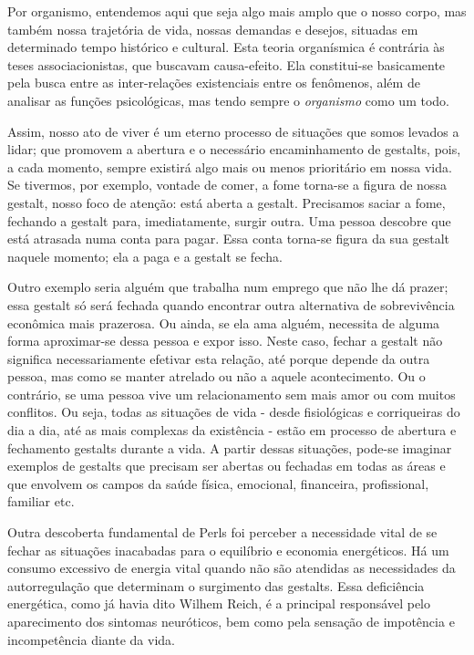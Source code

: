 Por organismo, entendemos aqui que seja algo mais amplo que o nosso
corpo, mas também nossa trajetória de vida, nossas demandas e desejos,
situadas em determinado tempo histórico e cultural. Esta teoria
organísmica é contrária às teses associacionistas, que buscavam
causa-efeito. Ela constitui-se basicamente pela busca entre as
inter-relações existenciais entre os fenômenos, além de analisar as
funções psicológicas, mas tendo sempre o \emph{organismo} como um todo.

Assim, nosso ato de viver é um eterno processo de situações que somos
levados a lidar; que promovem a abertura e o necessário encaminhamento
de gestalts, pois, a cada momento, sempre existirá algo mais ou menos
prioritário em nossa vida. Se tivermos, por exemplo, vontade de comer, a
fome torna-se a figura de nossa gestalt, nosso foco de atenção: está
aberta a gestalt. Precisamos saciar a fome, fechando a gestalt para,
imediatamente, surgir outra. Uma pessoa descobre que está atrasada numa
conta para pagar. Essa conta torna-se figura da sua gestalt naquele
momento; ela a paga e a gestalt se fecha.

Outro exemplo seria alguém que trabalha num emprego que não lhe dá
prazer; essa gestalt só será fechada quando encontrar outra alternativa
de sobrevivência econômica mais prazerosa. Ou ainda, se ela ama alguém,
necessita de alguma forma aproximar-se dessa pessoa e expor isso. Neste
caso, fechar a gestalt não significa necessariamente efetivar esta
relação, até porque depende da outra pessoa, mas como se manter atrelado
ou não a aquele acontecimento. Ou o contrário, se uma pessoa vive um
relacionamento sem mais amor ou com muitos conflitos. Ou seja, todas as
situações de vida - desde fisiológicas e corriqueiras do dia a dia, até
as mais complexas da existência - estão em processo de abertura e
fechamento gestalts durante a vida. A partir dessas situações, pode-se
imaginar exemplos de gestalts que precisam ser abertas ou fechadas em
todas as áreas e que envolvem os campos da saúde física, emocional,
financeira, profissional, familiar etc.

Outra descoberta fundamental de Perls foi perceber a necessidade vital
de se fechar as situações inacabadas para o equilíbrio e economia
energéticos. Há um consumo excessivo de energia vital quando não são
atendidas as necessidades da autorregulação que determinam o surgimento
das gestalts. Essa deficiência energética, como já havia dito Wilhem
Reich, é a principal responsável pelo aparecimento dos sintomas
neuróticos, bem como pela sensação de impotência e incompetência diante
da vida.

